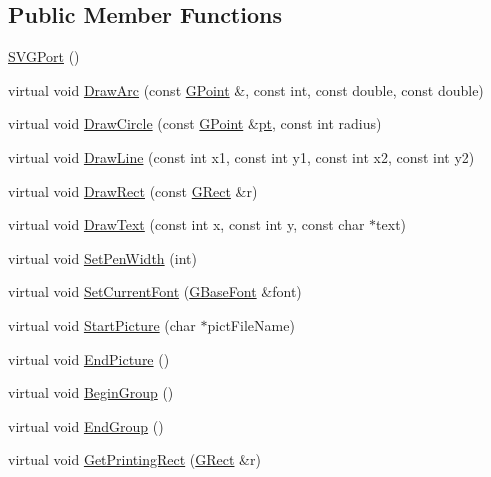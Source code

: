 \subsection*{Public Member Functions}
\begin{DoxyCompactItemize}
\item 
\mbox{\hyperlink{class_s_v_g_port_ae5600d35d7ba50be4395b575a8d61c79}{S\+V\+G\+Port}} ()
\item 
virtual void \mbox{\hyperlink{class_s_v_g_port_aa849012cbcbb27a9db820cee968093c9}{Draw\+Arc}} (const \mbox{\hyperlink{class_g_point}{G\+Point}} \&, const int, const double, const double)
\item 
virtual void \mbox{\hyperlink{class_s_v_g_port_a9aba350c03b01d93168882746b18ec07}{Draw\+Circle}} (const \mbox{\hyperlink{class_g_point}{G\+Point}} \&\mbox{\hyperlink{rings_8cpp_af69bbacaaf68a115b351c5d1e29c3cc8}{pt}}, const int radius)
\item 
virtual void \mbox{\hyperlink{class_s_v_g_port_ab51984003b6e8f6170ef3fe4ba09b030}{Draw\+Line}} (const int x1, const int y1, const int x2, const int y2)
\item 
virtual void \mbox{\hyperlink{class_s_v_g_port_a16219cfcb3520433a2c402c83b7ac47b}{Draw\+Rect}} (const \mbox{\hyperlink{class_g_rect}{G\+Rect}} \&r)
\item 
virtual void \mbox{\hyperlink{class_s_v_g_port_a94dc5a4fee82bacdd3160ea25827d7bb}{Draw\+Text}} (const int x, const int y, const char $\ast$text)
\item 
virtual void \mbox{\hyperlink{class_s_v_g_port_a3dbd4c8a9df41ccd1d05d362cec289a5}{Set\+Pen\+Width}} (int)
\item 
virtual void \mbox{\hyperlink{class_s_v_g_port_ac9b98b54d4b9b1e519d2741f5e8be837}{Set\+Current\+Font}} (\mbox{\hyperlink{class_g_base_font}{G\+Base\+Font}} \&font)
\item 
virtual void \mbox{\hyperlink{class_s_v_g_port_a930228d552d729c5aeb0aa8fb731d303}{Start\+Picture}} (char $\ast$pict\+File\+Name)
\item 
virtual void \mbox{\hyperlink{class_s_v_g_port_a564266843879b682d84b9aefad185662}{End\+Picture}} ()
\item 
virtual void \mbox{\hyperlink{class_s_v_g_port_a75ba37175c0a1fb943e1fd34c1e23f01}{Begin\+Group}} ()
\item 
virtual void \mbox{\hyperlink{class_s_v_g_port_a169f01fd03ef513e6d19df2ceb29234b}{End\+Group}} ()
\item 
virtual void \mbox{\hyperlink{class_s_v_g_port_a8b8bcfc066089734819ba861dd5a0834}{Get\+Printing\+Rect}} (\mbox{\hyperlink{class_g_rect}{G\+Rect}} \&r)

\end{DoxyCompactItemize}

